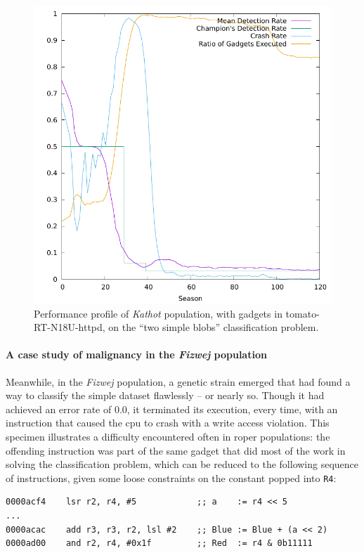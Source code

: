 \documentclass[12pt,glossary]{dalthesis}
\begin{document}
\begin{figure}[htbp]
\centering
\includegraphics[width=.9\linewidth]{../images/plots/kathot_fitness.pdf}
\caption{\label{fig:org9709a0f}
Performance profile of \emph{Kathot} population, with gadgets in tomato-RT-N18U-httpd, on the ``two simple blobs'' classification problem.}
\end{figure}

\paragraph{A case study of malignancy in the \emph{Fizwej} population}
\label{sec:orgea544b8}
\label{orgc36333f}

Meanwhile, in the \emph{Fizwej} population, a genetic strain emerged that had found
a way to classify the simple dataset flawlessly -- or nearly so. Though it 
had achieved an error rate of 0.0, it terminated its execution, every time, 
with an instruction that caused the \gls{cpu} to crash with a write access violation.
This specimen illustrates a difficulty encountered often in \gls{roper} populations:
the offending instruction was part of the same gadget that did most of the work
in solving the classification problem, which can be reduced to the following sequence
of instructions, given some loose constraints on the constant popped into \texttt{R4}:
\lstset{language=asm,label= ,caption= ,captionpos=b,numbers=none}
\begin{lstlisting}
0000acf4    lsr r2, r4, #5            ;; a    := r4 << 5
...
0000acac    add r3, r3, r2, lsl #2    ;; Blue := Blue + (a << 2)
0000ad00    and r2, r4, #0x1f         ;; Red  := r4 & 0b11111
\end{lstlisting}
\end{document}
